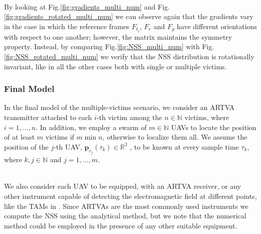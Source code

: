 \documentclass[main]{subfiles}
\begin{document}
\noindent\\
By looking at Fig.\ref{fig:gradients_multi_num} and Fig.\ref{fig:gradients_rotated_multi_num}
we can observe again that the gradients vary in the case in which the reference
frames $F_{t_i}$, $F_r$ and $F_g$ have different orientations with respect to one another;
however, the matrix maintains the symmetry property.
Instead, by comparing Fig.\ref{fig:NSS_multi_num} with Fig.\ref{fig:NSS_rotated_multi_num}
we verify that the NSS distribution is rotationally invariant, like in all the other cases both with 
single or multiple victims.


\subsubsection{Final Model}
In the final model of the multiple-victims scenario, we consider an ARTVA transmitter attached 
to each $i$-th victim among the $n \in \mathbb{N}$ victims, where \( i = 1, \ldots, n \).
In addition, we employ a swarm of $m \in \mathbb{N}$ UAVs to locate the position
of at least $m$ victims if $m \min n$, otherwise to localize them all.
We assume the position of the $j$-th UAV, \( \mathbf{p}_{r_j}(\tau_k) \in \mathbb{R}^3 \) ,
to be known at every sample time \( \tau_k \), where \( k, j \in \mathbb{N} \) 
and \( j = 1, \ldots, m \).

\noindent\\
We also consider each UAV to be equipped, with an ARTVA receiver, or any other 
instrument capable of detecting the electromagnetic field at different points,
like the TAMs in \cite{NSS_single_localization}.
Since ARTVAs are the most commonly used instruments we compute the NSS using the
analytical method, but we note that the numerical method could be employed
in the presence of any other suitable equipment.
\end{document}
